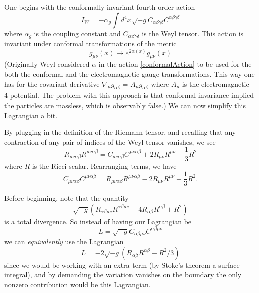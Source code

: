 
One begins with the conformally-invariant fourth order action
\begin{equation}\label{conformalAction}
I_{W} = -\alpha_{g}\int
d^{4}x\sqrt{-g}C_{\alpha\beta\gamma\delta}C^{\alpha\beta\gamma\delta}
\end{equation}
where $\alpha_{g}$ is the coupling constant and
$C_{\alpha\beta\gamma\delta}$ is the Weyl tensor. This action is
invariant under conformal transformations of the metric
\begin{equation*}
g_{\mu\nu}(x)\to e^{2\alpha(x)}g_{\mu\nu}(x)
\end{equation*}
(Originally Weyl considered $\alpha$ in the action
\eqref{conformalAction} to be used for the both the conformal and
the electromagnetic gauge transformations. This way one has for the
covariant derivative $\nabla_{\mu}g_{\alpha\beta} =
A_{\mu}g_{\alpha\beta}$ where $A_{\mu}$ is the electromagnetic
4-potential. The problem with this approach is that conformal
invariance implied the particles are massless, which is observably
false.) We can now simplify this Lagrangian a bit.

By plugging in the definition of the Riemann tensor, and recalling
that any contraction of any pair of indices of the Weyl tensor
vanishes, we see
\begin{equation}
R_{\mu\nu\alpha\beta}R^{\mu\nu\alpha\beta} =
C_{\mu\nu\alpha\beta}C^{\mu\nu\alpha\beta} + 2R_{\mu\nu}R^{\mu\nu} - \frac{1}{3}R^{2}
\end{equation}
where $R$ is the Ricci scalar. Rearranging terms, we have
\begin{equation}
C_{\mu\nu\alpha\beta}C^{\mu\nu\alpha\beta} =
R_{\mu\nu\alpha\beta}R^{\mu\nu\alpha\beta} -  2R_{\mu\nu}R^{\mu\nu} + \frac{1}{3}R^{2}.
\end{equation}


Before beginning, note that the quantity~\cite{Kazanas:1988qa,Lanczos:1938sf}
\begin{equation}
\sqrt{-g}\left(R_{\alpha\beta\mu\nu}R^{\alpha\beta\mu\nu} -
4R_{\alpha\beta}R^{\alpha\beta} + R^{2}\right)
\end{equation}
is a total divergence. So instead of having our Lagrangian be
\begin{equation}
L = \sqrt{-g}C_{\alpha\beta\mu\nu}C^{\alpha\beta\mu\nu}
\end{equation}
we can \emph{equivalently} use the Lagrangian
\begin{equation}
L = -2\sqrt{-g}(R_{\alpha\beta}R^{\alpha\beta} - R^{2}/3)
\end{equation}
since we would be working with an extra term (by Stoke's theorem a surface
integral), and by demanding the variation vanishes on the boundary
the only nonzero contribution would be this Lagrangian.


